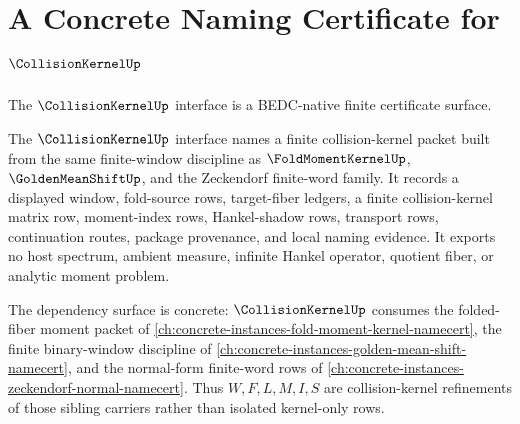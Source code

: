 \chapter{A Concrete Naming Certificate for $\CollisionKernelUp$}
\label{ch:concrete-instances-collisionkernel-namecert}

The $\CollisionKernelUp$ interface is a BEDC-native finite certificate surface.

The $\CollisionKernelUp$ interface names a finite collision-kernel packet built from the same finite-window discipline as $\FoldMomentKernelUp$, $\GoldenMeanShiftUp$, and the Zeckendorf finite-word family. It records a displayed window, fold-source rows, target-fiber ledgers, a finite collision-kernel matrix row, moment-index rows, Hankel-shadow rows, transport rows, continuation routes, package provenance, and local naming evidence. It exports no host spectrum, ambient measure, infinite Hankel operator, quotient fiber, or analytic moment problem.

The dependency surface is concrete: $\CollisionKernelUp$ consumes the folded-fiber moment packet of \autoref{ch:concrete-instances-fold-moment-kernel-namecert}, the finite binary-window discipline of \autoref{ch:concrete-instances-golden-mean-shift-namecert}, and the normal-form finite-word rows of \autoref{ch:concrete-instances-zeckendorf-normal-namecert}. Thus $W,F,L,M,I,S$ are collision-kernel refinements of those sibling carriers rather than isolated kernel-only rows.

